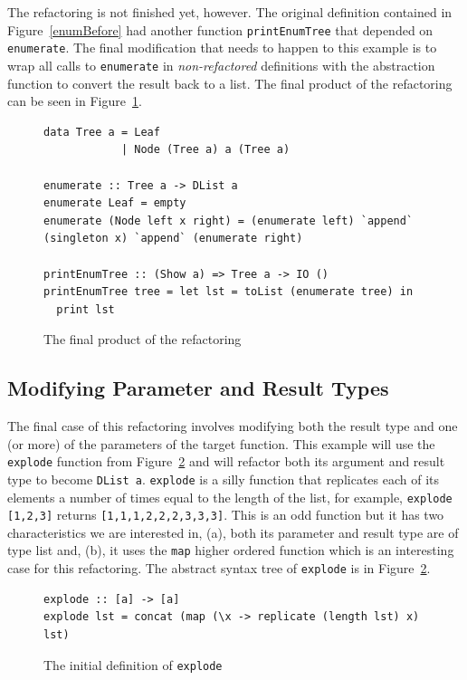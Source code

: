 The refactoring is not finished yet, however. The original definition contained in Figure~\ref{enumBefore} had another function \texttt{printEnumTree} that depended on \texttt{enumerate}. The final modification that needs to happen to this example is to wrap all calls to \texttt{enumerate} in \textit{non-refactored} definitions with the abstraction function to convert the result back to a list. The final product of the refactoring can be seen in Figure~\ref{enumFinal}.

\begin{figure}[t]
\begin{lstlisting}
data Tree a = Leaf
            | Node (Tree a) a (Tree a)

enumerate :: Tree a -> DList a
enumerate Leaf = empty
enumerate (Node left x right) = (enumerate left) `append` (singleton x) `append` (enumerate right)

printEnumTree :: (Show a) => Tree a -> IO ()
printEnumTree tree = let lst = toList (enumerate tree) in
  print lst
\end{lstlisting}
\caption{The final product of the refactoring}
\label{enumFinal}
\end{figure}

\subsection{Modifying Parameter and Result Types}

The final case of this refactoring involves modifying both the result type and one (or more) of the parameters of the target function. This example will use the \texttt{explode} function from Figure~\ref{explode} and will refactor both its argument and result type to become \texttt{DList a}. \texttt{explode} is a silly function that replicates each of its elements a number of times equal to the length of the list, for example, \texttt{explode [1,2,3]} returns \texttt{[1,1,1,2,2,2,3,3,3]}. This is an odd function but it has two characteristics we are interested in, (a), both its parameter and result type are of type list and, (b), it uses the \texttt{map} higher ordered function which is an interesting case for this refactoring. The abstract syntax tree of \texttt{explode} is in Figure~\ref{explode}.

\begin{figure}[t]
\begin{lstlisting}
explode :: [a] -> [a]
explode lst = concat (map (\x -> replicate (length lst) x) lst)
\end{lstlisting}
\caption{The initial definition of \texttt{explode}}
\label{explode}
\end{figure}


